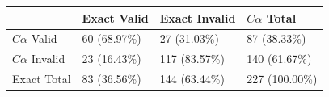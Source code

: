 \begin{tabular}{llll}
\toprule
 & Exact Valid & Exact Invalid & $C\alpha$ Total \\
\midrule
$C\alpha$ Valid & 60 (68.97\%) & 27 (31.03\%) & 87 (38.33\%) \\
$C\alpha$ Invalid & 23 (16.43\%) & 117 (83.57\%) & 140 (61.67\%) \\
Exact Total & 83 (36.56\%) & 144 (63.44\%) & 227 (100.00\%) \\
\bottomrule
\end{tabular}
